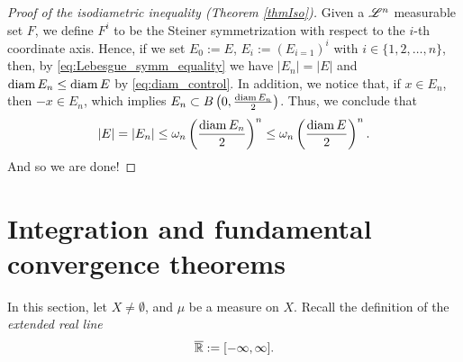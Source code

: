 \begin{proof}[Proof of the isodiametric inequality (Theorem \ref{thmIso})]
Given a $\mathscr{L}^{n}$ measurable set $F$, we define $F^i$ to be the Steiner
symmetrization with respect to the $i$-th coordinate axis. Hence, if we set $E_0 := E$, $E_i := (E_{i=1})^i$ with $i \in \{1,2,\dots,n\}$, then, by \eqref{eq:Lebesgue_symm_equality} we have $|E_n| = |E|$ and $\operatorname{diam} E_n \leq \operatorname{diam} E$ by \eqref{eq:diam_control}. In addition, we notice that, if $x\in E_n$, then $-x \in E_n$, which implies $E_n \subset B\left(0,\frac{\operatorname{diam} E_n}{2}\right)$. Thus, we conclude that
\begin{equation*}
|E| = |E_{n}| \le \omega_{n} \left ( \frac{\operatorname{diam} E_{n}}{2} \right )^{n} \le \omega_{n} \left ( \frac{\operatorname{diam} E}{2} \right )^{n}.
\end{equation*}
And so we are done!
\end{proof}

\section{Integration and fundamental convergence theorems}
 
In this section, let $X \neq \emptyset$, and $\mu$ be a measure on $X$. Recall the definition of the {\em extended real line} $$\overline{\mathbb{R}}:= [-\infty,\infty].$$

